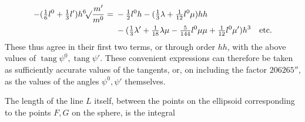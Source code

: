 \[
\begin{aligned}
-(\tfrac{1}{6}l^0+\tfrac{1}{3}l')h\BareRoot[6]{\frac{m'}{m^0}}={}&-\tfrac{1}{2}l^0h-(\tfrac{1}{3}\lambda+\tfrac{1}{12}l^0\mu)hh\\
&-(\tfrac{1}{3}\lambda'+\tfrac{1}{18}\lambda\mu-\tfrac{5}{144}l^0\mu\mu+\tfrac{1}{12}l^0\mu')h^3\quad\text{etc.}
\end{aligned}
\]
These thus agree in their first two terms, or through order \(hh\), with the above values of \(\operatorname{tang}\psi^0,\operatorname{tang}\psi'\). These convenient expressions can therefore be taken as sufficiently accurate values of the tangents, or, on including the factor \(206265''\), as the values of the angles \(\psi^0,\psi'\) themselves.

The length of the line \(L\) itself, between the points on the ellipsoid corresponding to the points \(F,G\) on the sphere, is the integral
